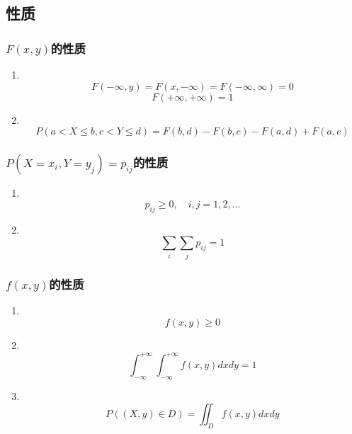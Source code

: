 \subsection{性质} %
\label{sub:性质}
\subsubsection{$F(x,y)$的性质}
\begin{enumerate}
	\item \\
	\begin{equation}
		F(-\infty, y) = F(x, -\infty) = F(-\infty, \infty) = 0
	\end{equation}
	\begin{equation}
		F(+\infty, +\infty) = 1
	\end{equation}

	\item \\
	\begin{equation}
		P(a<X\leq b, c<Y\leq d) = F(b,d) - F(b,c) - F(a,d) + F(a,c)
	\end{equation}
\end{enumerate}

\subsubsection{$P(X=x_i, Y=y_j)=p_{ij}$的性质}
\begin{enumerate}
	\item \\
	\begin{equation}
		p_{ij} \geq 0, \quad i,j = 1,2, \dots
	\end{equation}

	\item \\
	\begin{equation}
		\sum_i \sum_j p_{ij} = 1
	\end{equation}
\end{enumerate}

\subsubsection{$f(x,y)$的性质}
\begin{enumerate}
	\item \\
	\begin{equation}
		f(x, y) \geq 0
	\end{equation}
	\item \\
	\begin{equation}
		\int_{-\infty}^{+\infty} \int_{-\infty}^{+\infty}f(x,y)dxdy = 1
	\end{equation}
	\item \\
	\begin{equation}
		P((X,y)\in D) = \iint_Df(x,y) dxdy
	\end{equation}
	
\end{enumerate}

